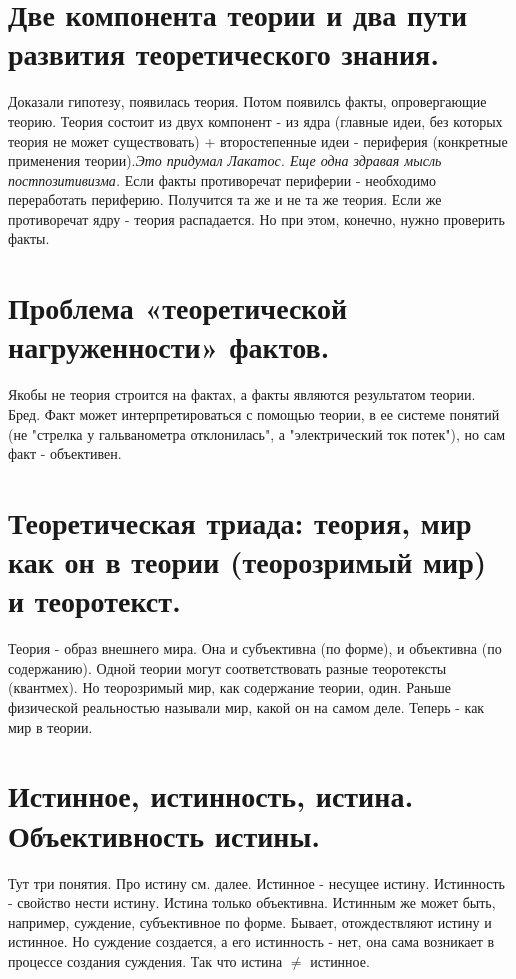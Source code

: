 \section{ Две компонента теории и два пути развития теоретического знания.}
Доказали гипотезу, появилась теория. Потом появилсь факты, опровергающие теорию. Теория состоит из двух компонент - из ядра (главные идеи, без которых теория не может существовать) + второстепенные идеи - периферия (конкретные применения теории).\textit{Это придумал Лакатос. Еще одна здравая мысль постпозитивизма.} Если факты противоречат периферии - необходимо переработать периферию. Получится та же и не та же теория. Если же противоречат ядру - теория распадается. Но при этом, конечно, нужно проверить факты.

\section{ Проблема «теоретической нагруженности» фактов.}
Якобы не теория строится на фактах, а факты являются результатом теории. Бред. Факт может интерпретироваться с помощью теории, в ее системе понятий (не "стрелка у гальванометра отклонилась", а "электрический ток потек"), но сам факт - объективен.

\section{ Теоретическая триада: теория, мир как он в теории (теорозримый мир) и теоротекст.}
Теория - образ внешнего мира. Она и субъективна (по форме), и объективна (по содержанию). Одной теории могут соответствовать разные теоротексты (квантмех). Но теорозримый мир, как содержание теории, один.
Раньше физической реальностью называли мир, какой он на самом деле. Теперь - как мир в теории.

\section{ Истинное, истинность, истина. Объективность истины.}
Тут три понятия. Про истину см. далее. Истинное - несущее истину. Истинность - свойство нести истину. Истина только объективна. Истинным же может быть, например, суждение, субъективное по форме. Бывает, отождествляют истину и истинное. Но суждение создается, а его истинность - нет, она сама возникает в процессе создания суждения. Так что истина $\ne$ истинное.

